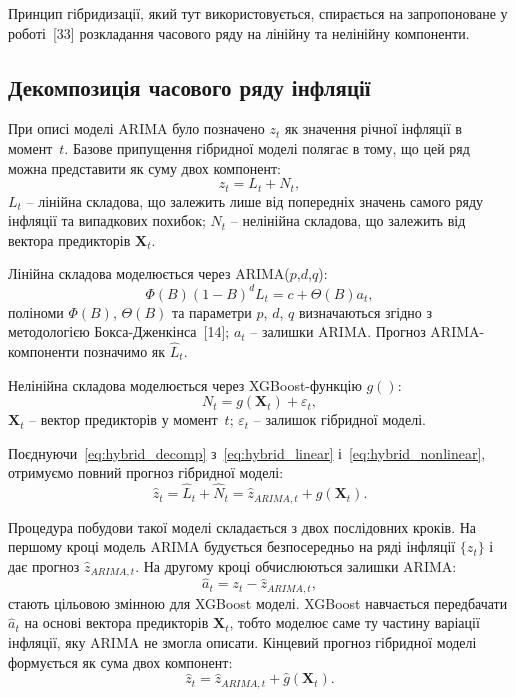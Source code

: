 \documentclass{bachelor_thesis}
\begin{document}
Принцип гібридизації, який тут використовується, спирається на запропоноване у роботі~[33] розкладання часового ряду на лінійну та нелінійну компоненти.

\subsection{Декомпозиція часового ряду інфляції}

При описі моделі ARIMA було позначено $z_t$ як значення річної інфляції в момент~$t$. Базове припущення гібридної моделі полягає в тому, що цей ряд можна представити як суму двох компонент:
\begin{equation}\label{eq:hybrid_decomp}
z_t = L_t + N_t,
\end{equation}
 $L_t$ -- лінійна складова, що залежить лише від попередніх значень самого ряду інфляції та випадкових похибок; $N_t$ -- нелінійна складова, що залежить від вектора предикторів $\mathbf{X}_t$.

Лінійна складова моделюється через ARIMA($p$,$d$,$q$):
\begin{equation}\label{eq:hybrid_linear}
\Phi(B) (1 - B)^d L_t = c + \Theta(B) a_t,
\end{equation}
 поліноми $\Phi(B)$, $\Theta(B)$ та параметри $p$, $d$, $q$ визначаються згідно з методологією Бокса-Дженкінса~[14]; $a_t$ -- залишки ARIMA. Прогноз ARIMA-компоненти позначимо як $\hat{L}_t$.

Нелінійна складова моделюється через XGBoost-функцію $g()$:
\begin{equation}\label{eq:hybrid_nonlinear}
N_t = g(\mathbf{X}_t) + \varepsilon_t,
\end{equation}
 $\mathbf{X}_t$ -- вектор предикторів у момент~$t$; $\varepsilon_t$ -- залишок гібридної моделі.

Поєднуючи~\eqref{eq:hybrid_decomp} з~\eqref{eq:hybrid_linear} і~\eqref{eq:hybrid_nonlinear}, отримуємо повний прогноз гібридної моделі:
\begin{equation*}
\hat{z}_t = \hat{L}_t + \hat{N}_t = \hat{z}_{ARIMA, t} + g(\mathbf{X}_t).
\end{equation*}

Процедура побудови такої моделі складається з двох послідовних кроків. На першому кроці модель ARIMA будується безпосередньо на ряді інфляції $\{z_t\}$ і дає прогноз $\hat{z}_{ARIMA, t}$. На другому кроці обчислюються залишки ARIMA:
\begin{equation}\label{eq:arima_residuals}
\hat{a}_t = z_t - \hat{z}_{ARIMA, t},
\end{equation}
 стають цільовою змінною для XGBoost моделі. XGBoost навчається передбачати $\hat{a}_t$ на основі вектора предикторів $\mathbf{X}_t$, тобто моделює саме ту частину варіації інфляції, яку ARIMA не змогла описати. Кінцевий прогноз гібридної моделі формується як сума двох компонент:
\begin{equation}\label{eq:hybrid_forecast}
\hat{z}_t = \hat{z}_{ARIMA, t} + \hat{g}(\mathbf{X}_t).
\end{equation}
\end{document}
